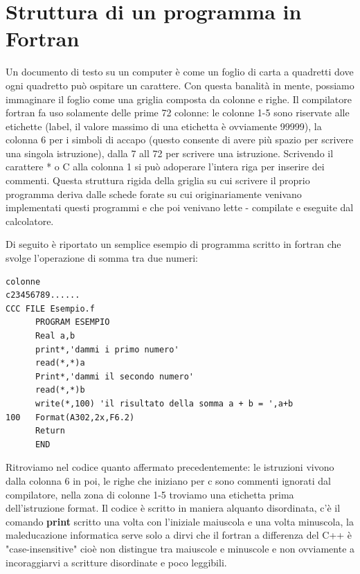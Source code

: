 \documentclass[11pt,fleqn]{book} %
\begin{document}

\section{Struttura di un programma in Fortran}

Un documento di testo su un computer è come un foglio di carta a quadretti dove ogni quadretto può ospitare un carattere. Con questa banalità in mente, possiamo immaginare il foglio come una griglia composta da colonne e righe. Il compilatore fortran fa uso solamente delle prime 72 colonne: le colonne 1-5 sono riservate alle etichette (label, il valore massimo di una etichetta è ovviamente 99999), la colonna 6 per i simboli di accapo (questo consente di avere più spazio per scrivere una singola istruzione), dalla 7 all 72 per scrivere una istruzione.
Scrivendo il carattere * o C alla colonna 1 si può adoperare l'intera riga per inserire dei commenti.
Questa struttura rigida della griglia su cui scrivere il proprio programma deriva dalle schede forate su cui originariamente venivano implementati questi programmi e che poi venivano lette - compilate e eseguite dal calcolatore.

Di seguito è riportato un semplice esempio di programma scritto in fortran che svolge l'operazione di somma tra due numeri:
\begin{verbatim}
colonne
c23456789......
CCC FILE Esempio.f
      PROGRAM ESEMPIO
      Real a,b
      print*,'dammi i primo numero'
      read(*,*)a
      Print*,'dammi il secondo numero'
      read(*,*)b
      write(*,100) 'il risultato della somma a + b = ',a+b
100   Format(A302,2x,F6.2)
      Return
      END      
\end{verbatim}

Ritroviamo nel codice quanto affermato precedentemente: le istruzioni vivono 
dalla colonna 6 in poi, le righe che iniziano per c sono commenti ignorati dal compilatore, nella zona di colonne 1-5 troviamo una etichetta prima dell'istruzione format. Il codice è scritto in maniera alquanto disordinata, 
c'è il comando \textbf{print} scritto una volta con l'iniziale maiuscola e una volta minuscola, la maleducazione informatica serve solo a dirvi che il fortran a differenza del C++ è "case-insensitive" cioè non distingue tra maiuscole e minuscole e non ovviamente a incoraggiarvi a scritture disordinate e poco leggibili.
\end{document}
